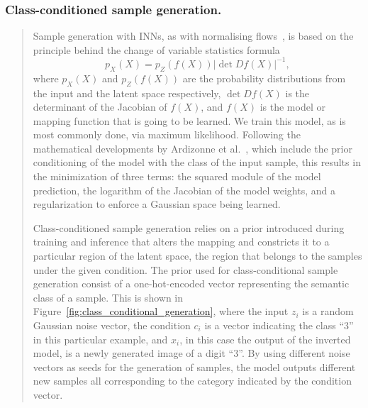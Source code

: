 \subsubsection*{Class-conditioned sample generation.} 
\begin{quote}
Sample generation with INNs, as with normalising flows~\cite{2018_NeurIPS_GLOW}, is based on the principle behind the change of variable statistics formula 
% 
\begin{equation}
p_{X}(X) = p_{Z}(f(X))|\det Df(X)|^{-1},     
\end{equation}
% 
where $p_{X}(X)$ and $p_{Z}(f(X))$ are the probability distributions from the input and the latent space respectively, $\det Df(X)$ is the determinant of the Jacobian of $f(X)$, and $f(X)$ is the model or mapping function that is going to be learned. We train this model, as is most commonly done, via maximum likelihood. Following the mathematical developments by Ardizonne et al.~\cite{2019_arxiv_cinn}, which include the prior conditioning of the model with the class of the input sample, this results in the minimization of three terms: the squared module of the model prediction, the logarithm of the Jacobian of the model weights, and a regularization to enforce a Gaussian space being learned.

Class-conditioned sample generation relies on a prior introduced during training and inference that alters the mapping and constricts it to a particular region of the latent space, the region that belongs to the samples under the given condition. The prior used for class-conditional sample generation consist of a one-hot-encoded vector representing the semantic class of a sample. This is shown in Figure~\ref{fig:class_conditional_generation}, where the input $z_i$ is a random Gaussian noise vector, the condition $c_i$ is a vector indicating the class ``3'' in this particular example, and $x_i$, in this case the output of the inverted model, is a newly generated image of a digit ``3''. By using different noise vectors as seeds for the generation of samples, the model outputs different new samples all corresponding to the category indicated by the condition vector. 


\end{quote}
